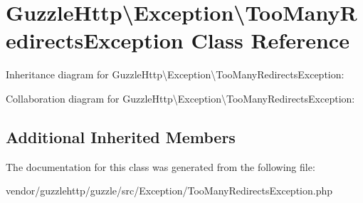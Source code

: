\hypertarget{classGuzzleHttp_1_1Exception_1_1TooManyRedirectsException}{}\section{Guzzle\+Http\textbackslash{}Exception\textbackslash{}Too\+Many\+Redirects\+Exception Class Reference}
\label{classGuzzleHttp_1_1Exception_1_1TooManyRedirectsException}


Inheritance diagram for Guzzle\+Http\textbackslash{}Exception\textbackslash{}Too\+Many\+Redirects\+Exception\+:


Collaboration diagram for Guzzle\+Http\textbackslash{}Exception\textbackslash{}Too\+Many\+Redirects\+Exception\+:
\subsection*{Additional Inherited Members}


The documentation for this class was generated from the following file\+:\begin{DoxyCompactItemize}
\item 
vendor/guzzlehttp/guzzle/src/\+Exception/Too\+Many\+Redirects\+Exception.\+php\end{DoxyCompactItemize}
